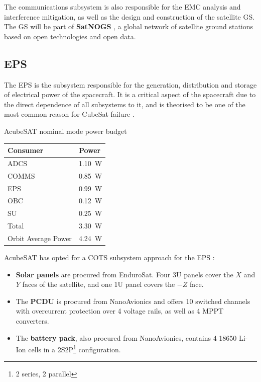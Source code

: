 \documentclass[a4paper,nobib,final]{tufte-book}
\begin{document}
The communications subsystem is also responsible for the \ac{EMC} analysis and interference mitigation, as well as the design and construction of the satellite \acl{GS}. The \acl{GS} will be part of \textbf{SatNOGS} \autocite{white_overview_satellite_2018}, a global network of satellite ground stations based on open technologies and open data.

\subsection{\acf{EPS}}
The \ac{EPS} is the subsystem responsible for the generation, distribution and storage of electrical power of the spacecraft. It is a critical aspect of the spacecraft due to the direct dependence of all subsystems to it, and is theorised to be one of the most common reason for CubeSat failure \autocite{langer_reliability_cubesats_2016,bouwmeester_survey_implementation_2017}.

\begin{margintable}
	\caption{AcubeSAT nominal mode power budget}
	\label{tab:power_budget}
	\begin{tabularx}{\linewidth}{@{}lX@{}}
		\toprule
		\textbf{Consumer}            & \textbf{Power}            \\ \midrule
		\acs{ADCS}          & \SI{1.10}{\watt} \\
		\acs{COMMS}         & \SI{0.85}{\watt} \\
		\acs{EPS}           & \SI{0.99}{\watt} \\
		\acs{OBC}           & \SI{0.12}{\watt} \\
		\acs{SU}            & \SI{0.25}{\watt} \\ \midrule
		Total               & \SI{3.30}{\watt} \\
		Orbit Average Power & \SI{4.24}{\watt} \\ \bottomrule
	\end{tabularx}
\end{margintable}

AcubeSAT has opted for a \ac{COTS} subsystem approach for the \ac{EPS} \autocite{DDJF_SYS}:
\begin{itemize}
	\item \textbf{Solar panels} are procured from EnduroSat. Four 3U panels cover the \(X\) and \(Y\) faces of the satellite, and one 1U panel covers the \(-Z\) face.
	\item The \textbf{\ac{PCDU}} is procured from NanoAvionics and offers 10 switched channels with overcurrent protection over 4 voltage rails, as well as 4 \ac{MPPT} converters.
	\item The \textbf{battery pack}, also procured from NanoAvionics, contains 4 18650 Li-Ion cells in a 2S2P\footnote{2 series, 2 parallel} configuration.
\end{itemize}
\end{document}
